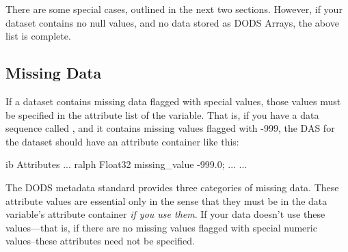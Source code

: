 There are some special cases, outlined in the next two sections.
However, if your dataset contains no null values, and no data stored
as DODS Arrays, the above list is complete.  



\subsection{Missing Data}

If a dataset contains missing data flagged with special values, those
values must be specified in the attribute list of the variable.  That
is, if you have a data sequence called , and it contains missing
values flagged with -999, the DAS for the dataset should have an
attribute container like this:

\begin{vcode}{ib}
Attributes {
  ...
  ralph {
     Float32 missing_value -999.0;
     ...
  }
  ...
}
\end{vcode}

The DODS metadata standard provides three categories of missing data.
These attribute values are essential only in the sense that they must
be in the data variable's attribute container \emph{if you use them}.
If your data doesn't use these values---that is, if there are no
missing values flagged with special numeric values--these attributes
need not be specified.

